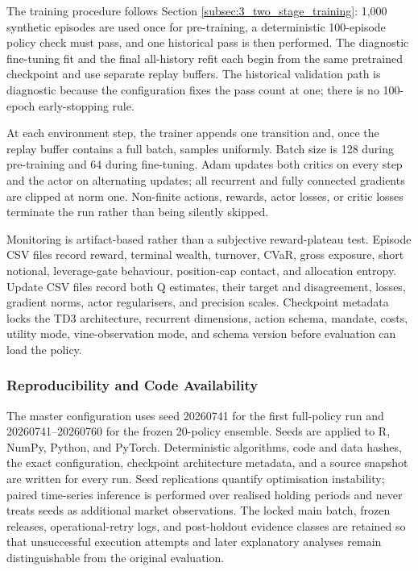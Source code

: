 The training procedure follows Section \ref{subsec:3_two_stage_training}: 1,000 synthetic episodes are used once for pre-training, a deterministic 100-episode policy check must pass, and one historical pass is then performed. The diagnostic fine-tuning fit and the final all-history refit each begin from the same pretrained checkpoint and use separate replay buffers. The historical validation path is diagnostic because the configuration fixes the pass count at one; there is no 100-epoch early-stopping rule.

At each environment step, the trainer appends one transition and, once the replay buffer contains a full batch, samples uniformly. Batch size is 128 during pre-training and 64 during fine-tuning. Adam updates both critics on every step and the actor on alternating updates; all recurrent and fully connected gradients are clipped at norm one. Non-finite actions, rewards, actor losses, or critic losses terminate the run rather than being silently skipped.

Monitoring is artifact-based rather than a subjective reward-plateau test. Episode CSV files record reward, terminal wealth, turnover, CVaR, gross exposure, short notional, leverage-gate behaviour, position-cap contact, and allocation entropy. Update CSV files record both Q estimates, their target and disagreement, losses, gradient norms, actor regularisers, and precision scales. Checkpoint metadata locks the TD3 architecture, recurrent dimensions, action schema, mandate, costs, utility mode, vine-observation mode, and schema version before evaluation can load the policy.

\subsubsection{Reproducibility and Code Availability}
\label{subsubsec:3_reproducibility}

The master configuration uses seed 20260741 for the first full-policy run and 20260741--20260760 for the frozen 20-policy ensemble. Seeds are applied to R, NumPy, Python, and PyTorch. Deterministic algorithms, code and data hashes, the exact configuration, checkpoint architecture metadata, and a source snapshot are written for every run. Seed replications quantify optimisation instability; paired time-series inference is performed over realised holding periods and never treats seeds as additional market observations. The locked main batch, frozen releases, operational-retry logs, and post-holdout evidence classes are retained so that unsuccessful execution attempts and later explanatory analyses remain distinguishable from the original evaluation.
